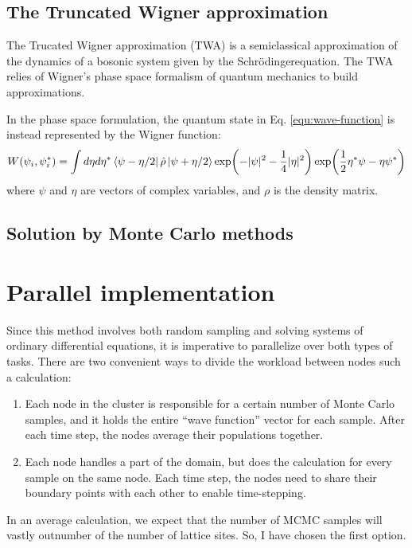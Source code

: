 \documentclass{article}
\newcommand{\Schroedinger}{Schr{\"o}dinger}
\begin{document}
\subsection{The Truncated Wigner approximation}

The Trucated Wigner approximation (TWA) is a semiclassical approximation of the dynamics of a bosonic system 
given by the \Schroedinger equation. The TWA relies of Wigner's phase space formalism of quantum mechanics to 
build approximations. 

In the phase space formulation, the quantum state in Eq. \ref{equ:wave-function} is instead represented by the 
Wigner function:
\begin{equation}
    \label{equ:wigner-function}
    W(\psi_i, \psi^\ast_i) = \int d\eta d\eta^\ast \bra{\psi - \eta/2} \hat{\rho} \ket{\psi + \eta/2} 
    \exp(-|\psi|^2 - \frac{1}{4}|\eta|^2) \exp(\frac{1}{2} \eta^\ast \psi - \eta \psi^\ast)
\end{equation}
where \(\psi\) and \(\eta\) are vectors of complex variables, and \(\rho\) is the density matrix. 

\subsection{Solution by Monte Carlo methods}

\section{Parallel implementation} \label{parallel}

Since this method involves both random sampling and solving systems of ordinary differential equations, it is 
imperative to parallelize over both types of tasks. 
There are two convenient ways to divide the workload between nodes such a calculation:
\begin{enumerate}
    \item Each node in the cluster is responsible for a certain number of Monte Carlo samples, 
    and it holds the entire ``wave function'' vector for each sample. After each time step, 
    the nodes average their populations together. 
    \item Each node handles a part of the domain, but does the calculation for every sample 
    on the same node. Each time step, the nodes need to share their boundary points with 
    each other to enable time-stepping. 
\end{enumerate}
In an average calculation, we expect that the number of MCMC samples will vastly outnumber of the number of lattice sites. 
So, I have chosen the first option.
\end{document}
